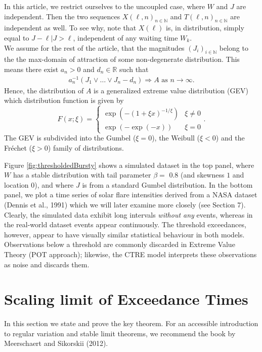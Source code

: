 \documentclass[]{elsarticle} %
\begin{document}
In this article, we restrict ourselves to the uncoupled case, where
\(W\) and \(J\) are independent. Then the two sequences
\(X(\ell, n)_{n \in \mathbb N}\) and \(T(\ell, n)_{n \in \mathbb N}\)
are independent as well. To see why, note that \(X(\ell)\) is, in
distribution, simply equal to \(J - \ell | J > \ell\), independent of
any waiting time \(W_k\).\\
We assume for the rest of the article, that the magnitudes
\((J_i)_{i \in \mathbb{N}}\) belong to the the max-domain of attraction
of some non-degenerate distribution. This means there exist \(a_n>0\)
and \(d_n \in \mathbb{R}\) such that \begin{align} \label{assumptionJs}
a_n^{-1}(J_1 \vee \ldots \vee J_n -d_n) \Rightarrow A \text{ as } n \rightarrow \infty.
\end{align} Hence, the distribution of \(A\) is a generalized extreme
value distribution (GEV) which distribution function is given by
\[ F(x;\xi) = \begin{cases}\exp(-(1+\xi x)^{-1/\xi}) & \xi\neq0 \\ \exp(-\exp(-x)) & \xi = 0\end{cases}.\]
The GEV is subdivided into the Gumbel (\(\xi=0\)), the Weibull
(\(\xi<0\)) and the Fréchet (\(\xi>0\)) family of distributions.

Figure \ref{fig:thresholdedBursty} shows a simulated dataset in the top
panel, where \(W\) has a stable distribution with tail parameter
\(\beta =\) 0.8 (and skewness \(1\) and location \(0\)), and where \(J\)
is from a standard Gumbel distribution. In the bottom panel, we plot a
time series of solar flare intensities derived from a NASA dataset
(Dennis et al., 1991) which we will later examine more closely (see
Section 7). Clearly, the simulated data exhibit long intervals
\emph{without any} events, whereas in the real-world dataset events
appear continuously. The threshold exceedances, however, appear to have
visually similar statistical behaviour in both models. Observations
below a threshold are commonly discarded in Extreme Value Theory (POT
approach); likewise, the CTRE model interprets these observations as
noise and discards them.

\hypertarget{sec:scaling}{%
\section{Scaling limit of Exceedance Times}\label{sec:scaling}}

In this section we state and prove the key theorem. For an accessible
introduction to regular variation and stable limit theorems, we
recommend the book by Meerschaert and Sikorskii (2012).
\end{document}
